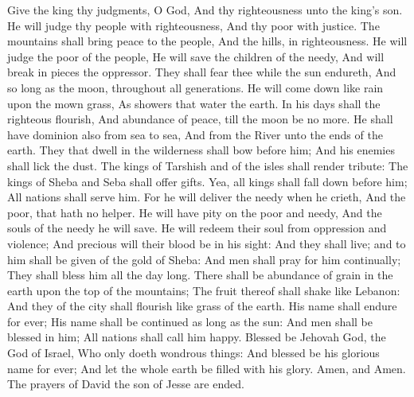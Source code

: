 Give the king thy judgments, O God, And thy righteousness unto the king’s son.  He will judge thy people with righteousness, And thy poor with justice.  The mountains shall bring peace to the people, And the hills, in righteousness.  He will judge the poor of the people, He will save the children of the needy, And will break in pieces the oppressor.  They shall fear thee while the sun endureth, And so long as the moon, throughout all generations.  He will come down like rain upon the mown grass, As showers that water the earth.  In his days shall the righteous flourish, And abundance of peace, till the moon be no more.  He shall have dominion also from sea to sea, And from the River unto the ends of the earth.  They that dwell in the wilderness shall bow before him; And his enemies shall lick the dust.  The kings of Tarshish and of the isles shall render tribute: The kings of Sheba and Seba shall offer gifts.  Yea, all kings shall fall down before him; All nations shall serve him.  For he will deliver the needy when he crieth, And the poor, that hath no helper.  He will have pity on the poor and needy, And the souls of the needy he will save.  He will redeem their soul from oppression and violence; And precious will their blood be in his sight:  And they shall live; and to him shall be given of the gold of Sheba: And men shall pray for him continually; They shall bless him all the day long.  There shall be abundance of grain in the earth upon the top of the mountains; The fruit thereof shall shake like Lebanon: And they of the city shall flourish like grass of the earth.  His name shall endure for ever; His name shall be continued as long as the sun: And men shall be blessed in him; All nations shall call him happy.  Blessed be Jehovah God, the God of Israel, Who only doeth wondrous things:  And blessed be his glorious name for ever; And let the whole earth be filled with his glory. Amen, and Amen.  The prayers of David the son of Jesse are ended. 

